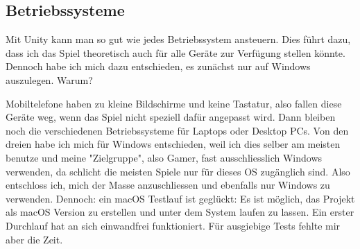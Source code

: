 \subsection{Betriebssysteme}
Mit Unity kann man so gut wie jedes Betriebssystem ansteuern.
Dies führt dazu, dass ich das Spiel theoretisch auch für alle Geräte zur Verfügung stellen könnte. 
Dennoch habe ich mich dazu entschieden, es zunächst nur auf Windows auszulegen.
Warum?

Mobiltelefone haben zu kleine Bildschirme und keine Tastatur, also fallen diese Geräte weg, wenn das Spiel nicht speziell dafür angepasst wird. Dann bleiben noch die verschiedenen Betriebssysteme für Laptops oder Desktop PCs.
Von den dreien habe ich mich für Windows entschieden, weil ich dies selber am meisten benutze und meine "Zielgruppe", also Gamer, fast ausschliesslich Windows verwenden, da schlicht die meisten Spiele nur für dieses OS zugänglich sind. Also entschloss ich, mich der Masse anzuschliessen und ebenfalls nur Windows zu verwenden. Dennoch: ein macOS Testlauf ist geglückt: Es ist möglich, das Projekt als macOS Version zu erstellen und unter dem System laufen zu lassen. Ein erster Durchlauf hat an sich einwandfrei funktioniert. Für ausgiebige Tests fehlte mir aber die Zeit.

